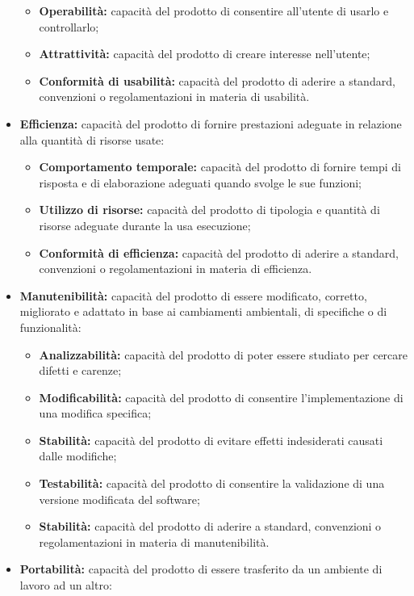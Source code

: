 \begin{itemize}
\begin{itemize}
		\item \textbf{Operabilità:} capacità del prodotto di consentire all'utente di usarlo e controllarlo;
		\item \textbf{Attrattività:} capacità del prodotto di creare interesse nell'utente;
		\item \textbf{Conformità di usabilità:} capacità del prodotto di aderire a standard, convenzioni o regolamentazioni in materia di usabilità.
	\end{itemize}
	\item \textbf{Efficienza:} capacità del prodotto di fornire prestazioni adeguate in relazione alla quantità di risorse usate:
	\begin{itemize}
		\item \textbf{Comportamento temporale:} capacità del prodotto di fornire tempi di risposta e di elaborazione adeguati quando svolge le sue funzioni;
		\item \textbf{Utilizzo di risorse:} capacità del prodotto di tipologia e quantità di risorse adeguate durante la usa esecuzione;
		\item \textbf{Conformità di efficienza:} capacità del prodotto di aderire a standard, convenzioni o regolamentazioni in materia di efficienza.
	\end{itemize}
	\item \textbf{Manutenibilità:} capacità del prodotto di essere modificato, corretto, migliorato e adattato in base ai cambiamenti ambientali, di specifiche o di funzionalità:
	\begin{itemize}
		\item \textbf{Analizzabilità:} capacità del prodotto di poter essere studiato per cercare difetti e carenze;
		\item \textbf{Modificabilità:} capacità del prodotto di consentire l'implementazione di una modifica specifica;
		\item \textbf{Stabilità:} capacità del prodotto di evitare effetti indesiderati causati dalle modifiche;
		\item \textbf{Testabilità:} capacità del prodotto di consentire la validazione di una versione modificata del software;
		\item \textbf{Stabilità:} capacità del prodotto di aderire a standard, convenzioni o regolamentazioni in materia di manutenibilità.
	\end{itemize}
	\item \textbf{Portabilità:} capacità del prodotto di essere trasferito da un ambiente di lavoro ad un altro:
	\begin{itemize}

\end{itemize}
\end{itemize}
